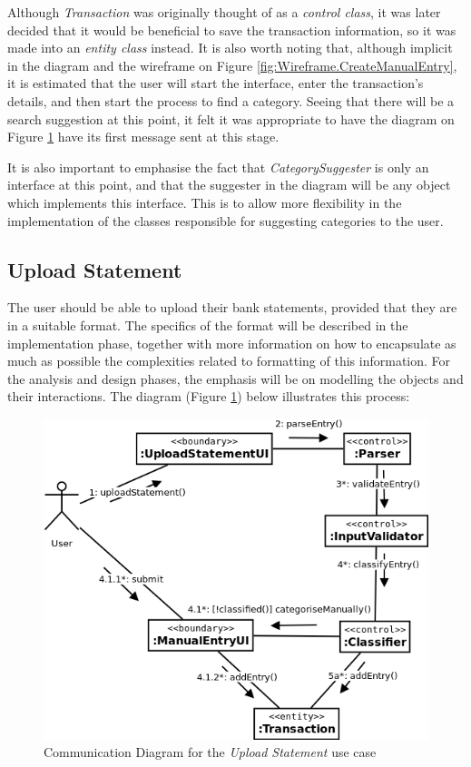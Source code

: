 Although \emph{Transaction} was originally thought of as a \emph{control
class}, it was later decided that it would be beneficial to save the
transaction information, so it was made into an \emph{entity class} instead.
It is also worth noting that, although implicit in the diagram and the
wireframe on Figure \ref{fig:Wireframe.CreateManualEntry}, it is estimated that
the user will start the interface, enter the transaction's details, and then
start the process to find a category. Seeing that there will be a search
suggestion at this point, it felt it was appropriate to have the diagram on
Figure \ref{fig:CommDiagram.CreateManualEntry} have its first message sent at
this stage.

It is also important to emphasise the fact that \emph{CategorySuggester} is
only an interface at this point, and that the suggester in the diagram will be
any object which implements this interface. This is to allow more flexibility
in the implementation of the classes responsible for suggesting categories to
the user.

\subsection{Upload Statement} \label{sec:AnalysisAndDesign.UploadStatement}

The user should be able to upload their bank statements, provided that they are
in a suitable format. The specifics of the format will be described in the
implementation phase, together with more information on how to encapsulate as
much as possible the complexities related to formatting of this information.
For the analysis and design phases, the emphasis will be on modelling the
objects and their interactions. The diagram (Figure
\ref{fig:CommDiagram.CreateManualEntry}) below illustrates this process:
\begin{figure}[ht!]
  \begin{center}
    \includegraphics[width=16cm]{./contents/img/Comm_Diagram_-_Upload_Statement.png}
  \end{center}
  \caption{Communication Diagram for the \emph{Upload Statement} use case}
  \label{fig:CommDiagram.CreateManualEntry}
\end{figure}
\FloatBarrier

